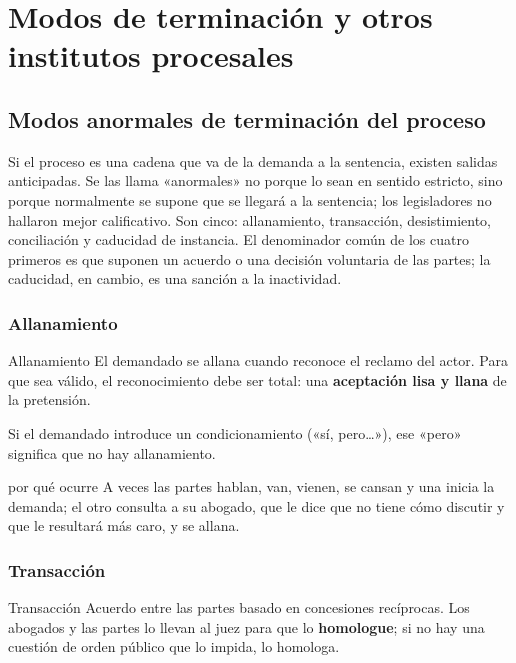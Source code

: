 \documentclass[12pt,oneside]{book}
\begin{document}
\part{Modos de terminación y otros institutos procesales}

\chapter{Modos anormales de terminación del proceso}\label{cap:modos}

Si el proceso es una cadena que va de la demanda a la sentencia, existen salidas anticipadas. Se las llama «anormales» no porque lo sean en sentido estricto, sino porque normalmente se supone que se llegará a la sentencia; los legisladores no hallaron mejor calificativo. Son cinco: allanamiento, transacción, desistimiento, conciliación y caducidad de instancia. El denominador común de los cuatro primeros es que suponen un acuerdo o una decisión voluntaria de las partes; la caducidad, en cambio, es una sanción a la inactividad.

\section{Allanamiento}

\begin{definicion}{Allanamiento}
El demandado se allana cuando reconoce el reclamo del actor. Para que sea válido, el reconocimiento debe ser total: una \textbf{aceptación lisa y llana} de la pretensión.
\end{definicion}

\begin{importante}
Si el demandado introduce un condicionamiento («sí, pero\ldots»), ese «pero» significa que no hay allanamiento.
\end{importante}

\begin{ejemplo}{por qué ocurre}
A veces las partes hablan, van, vienen, se cansan y una inicia la demanda; el otro consulta a su abogado, que le dice que no tiene cómo discutir y que le resultará más caro, y se allana.
\end{ejemplo}

\section{Transacción}

\begin{definicion}{Transacción}
Acuerdo entre las partes basado en concesiones recíprocas. Los abogados y las partes lo llevan al juez para que lo \textbf{homologue}; si no hay una cuestión de orden público que lo impida, lo homologa.
\end{definicion}
\end{document}
